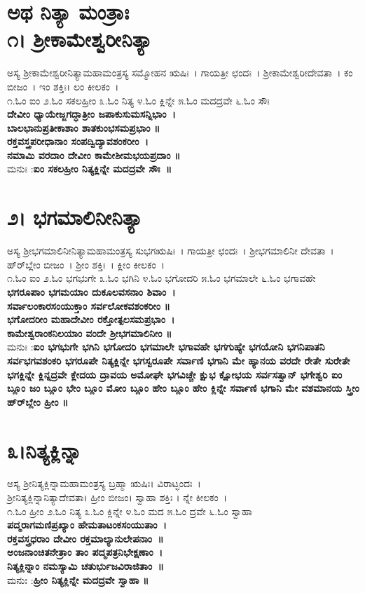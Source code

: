 \section{ಅಥ ನಿತ್ಯಾ ಮಂತ್ರಾಃ\\೧। ಶ್ರೀಕಾಮೇಶ್ವರೀನಿತ್ಯಾ}
ಅಸ್ಯ ಶ್ರೀಕಾಮೇಶ್ವರೀನಿತ್ಯಾಮಹಾಮಂತ್ರಸ್ಯ ಸಮ್ಮೋಹನ ಋಷಿಃ~। ಗಾಯತ್ರೀ ಛಂದಃ~। ಶ್ರೀಕಾಮೇಶ್ವರೀದೇವತಾ~। ಕಂ ಬೀಜಂ~। ಇಂ ಶಕ್ತಿಃ। ಲಂ ಕೀಲಕಂ~।\\
೧.ಓಂ ಐಂ ೨.ಓಂ ಸಕಲಹ್ರೀಂ ೩.ಓಂ ನಿತ್ಯ  ೪.ಓಂ ಕ್ಲಿನ್ನೇ ೫.ಓಂ ಮದದ್ರವೇ ೬.ಓಂ ಸೌಃ \\
\newpage
{\bfseries ದೇವೀಂ ಧ್ಯಾಯೇಜ್ಜಗದ್ಧಾತ್ರೀಂ ಜಪಾಕುಸುಮಸನ್ನಿಭಾಂ~।\\
ಬಾಲಭಾನುಪ್ರತೀಕಾಶಾಂ ಶಾತಕುಂಭಸಮಪ್ರಭಾಂ ॥\\
ರಕ್ತವಸ್ತ್ರಪರೀಧಾನಾಂ ಸಂಪದ್ವಿದ್ಯಾವಶಂಕರೀಂ~।\\
ನಮಾಮಿ ವರದಾಂ ದೇವೀಂ ಕಾಮೇಶೀಮಭಯಪ್ರದಾಂ ॥\\}
ಮನುಃ :{\bfseries  ಐಂ ಸಕಲಹ್ರೀಂ ನಿತ್ಯಕ್ಲಿನ್ನೇ ಮದದ್ರವೇ ಸೌಃ~॥}
\section{೨। ಭಗಮಾಲಿನೀನಿತ್ಯಾ}
ಅಸ್ಯ ಶ್ರೀಭಗಮಾಲಿನೀನಿತ್ಯಾಮಹಾಮಂತ್ರಸ್ಯ ಸುಭಗಋಷಿಃ~। ಗಾಯತ್ರೀ ಛಂದಃ~। ಶ್ರೀಭಗಮಾಲಿನೀ ದೇವತಾ~। ಹ್‌ರ್‌ಬ್ಲೇಂ ಬೀಜಂ~।  ಶ್ರೀಂ ಶಕ್ತಿಃ~। ಕ್ಲೀಂ ಕೀಲಕಂ~।\\
೧.ಓಂ ಐಂ  ೨.ಓಂ ಭಗಭುಗೇ ೩.ಓಂ ಭಗಿನಿ  ೪.ಓಂ ಭಗೋದರಿ  ೫.ಓಂ ಭಗಮಾಲೇ ೬.ಓಂ ಭಗಾವಹೇ\\
{\bfseries ಭಗರೂಪಾಂ ಭಗಮಯಾಂ ದುಕೂಲವಸನಾಂ ಶಿವಾಂ~।\\
ಸರ್ವಾಲಂಕಾರಸಂಯುಕ್ತಾಂ ಸರ್ವಲೋಕವಶಂಕರೀಂ ॥\\
ಭಗೋದರೀಂ ಮಹಾದೇವೀಂ ರಕ್ತೋತ್ಪಲಸಮಪ್ರಭಾಂ~।\\
ಕಾಮೇಶ್ವರಾಂಕನಿಲಯಾಂ ವಂದೇ ಶ್ರೀಭಗಮಾಲಿನೀಂ ॥\\}
ಮನುಃ :{\bfseries  ಐಂ ಭಗಭುಗೇ ಭಗಿನಿ ಭಗೋದರಿ ಭಗಮಾಲೇ ಭಗಾವಹೇ ಭಗಗುಹ್ಯೇ ಭಗಯೋನಿ ಭಗನಿಪಾತನಿ ಸರ್ವಭಗವಶಂಕರಿ ಭಗರೂಪೇ ನಿತ್ಯಕ್ಲಿನ್ನೇ ಭಗಸ್ವರೂಪೇ ಸರ್ವಾಣಿ ಭಗಾನಿ ಮೇ ಹ್ಯಾನಯ ವರದೇ ರೇತೇ ಸುರೇತೇ ಭಗಕ್ಲಿನ್ನೇ ಕ್ಲಿನ್ನದ್ರವೇ ಕ್ಲೇದಯ ದ್ರಾವಯ ಅಮೋಘೇ ಭಗವಿಚ್ಚೇ ಕ್ಷುಭ ಕ್ಷೋಭಯ ಸರ್ವಸತ್ವಾನ್ ಭಗೇಶ್ವರಿ ಐಂ ಬ್ಲೂಂ ಜಂ ಬ್ಲೂಂ ಭೇಂ ಬ್ಲೂಂ ಮೋಂ ಬ್ಲೂಂ ಹೇಂ ಬ್ಲೂಂ ಹೇಂ ಕ್ಲಿನ್ನೇ ಸರ್ವಾಣಿ ಭಗಾನಿ ಮೇ ವಶಮಾನಯ ಸ್ತ್ರೀಂ ಹ್‌ರ್‌ಬ್ಲೇಂ ಹ್ರೀಂ ॥}
\section{೩।ನಿತ್ಯಕ್ಲಿನ್ನಾ}
ಅಸ್ಯ ಶ್ರೀನಿತ್ಯಕ್ಲಿನ್ನಾಮಹಾಮಂತ್ರಸ್ಯ ಬ್ರಹ್ಮಾ ಋಷಿಃ। ವಿರಾಟ್ಛಂದಃ~।\\ ಶ್ರೀನಿತ್ಯಕ್ಲಿನ್ನಾನಿತ್ಯಾದೇವತಾ। ಹ್ರೀಂ ಬೀಜಂ। ಸ್ವಾಹಾ ಶಕ್ತಿಃ । ನ್ನೇ ಕೀಲಕಂ~।\\
೧.ಓಂ ಹ್ರೀಂ ೨.ಓಂ ನಿತ್ಯ  ೩.ಓಂ ಕ್ಲಿನ್ನೇ ೪.ಓಂ ಮದ ೫.ಓಂ ದ್ರವೇ ೬.ಓಂ ಸ್ವಾಹಾ\\
{\bfseries ಪದ್ಮರಾಗಮಣಿಪ್ರಖ್ಯಾಂ ಹೇಮತಾಟಂಕಸಂಯುತಾಂ~।\\
ರಕ್ತವಸ್ತ್ರಧರಾಂ ದೇವೀಂ ರಕ್ತಮಾಲ್ಯಾನುಲೇಪನಾಂ~॥\\
ಅಂಜನಾಂಚಿತನೇತ್ರಾಂ ತಾಂ ಪದ್ಮಪತ್ರನಿಭೇಕ್ಷಣಾಂ~।\\
ನಿತ್ಯಕ್ಲಿನ್ನಾಂ ನಮಸ್ಯಾಮಿ ಚತುರ್ಭುಜವಿರಾಜಿತಾಂ~॥\\}
ಮನುಃ :{\bfseries  ಹ್ರೀಂ ನಿತ್ಯಕ್ಲಿನ್ನೇ ಮದದ್ರವೇ ಸ್ವಾಹಾ ॥}
